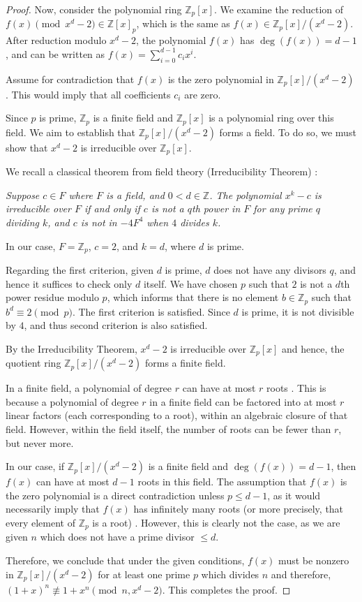 \documentclass{article}
\theoremstyle{plain}
\theoremstyle{definition}
\begin{document}
\begin{proof}
Now, consider the polynomial ring $\mathbb{Z}_p[x]$. We examine the reduction of $f(x) \pmod{x^d - 2} \in \mathbb{Z}[x]_p$, which is the same as $f(x) \in \mathbb{Z}_p[x]/(x^d - 2)$. After reduction modulo $x^d - 2$, the polynomial $f(x)$ has $\deg(f(x)) = d-1$, and can be written as $f(x) = \sum_{i=0}^{d-1} c_i x^i$.

Assume for contradiction that $f(x)$ is the zero polynomial in $\mathbb{Z}_p[x]/(x^d - 2)$. This would imply that all coefficients $c_i$ are zero.

Since $p$ is prime, $\mathbb{Z}_p$ is a finite field and $\mathbb{Z}_p[x]$ is a polynomial ring over this field. We aim to establish that $\mathbb{Z}_p[x]/(x^d - 2)$ forms a field. To do so, we must show that $x^d - 2$ is irreducible over $\mathbb{Z}_p[x]$.

We recall a classical theorem from field theory (Irreducibility Theorem) \cite{karpilovsky1989fields}:

\textit{Suppose $c \in F$ where $F$ is a field, and $0 < d \in \mathbb{Z}$. The polynomial $x^k - c$ is irreducible over $F$ if and only if $c$ is not a $q$th power in $F$ for any prime $q$ dividing $k$, and $c$ is not in $-4F^4$ when $4$ divides $k$.}

In our case, $F = \mathbb{Z}_p$, $c = 2$, and $k = d$, where $d$ is prime.

Regarding the first criterion, given $d$ is prime, $d$ does not have any divisors $q$, and hence it suffices to check only $d$ itself. We have chosen $p$ such that $2$ is not a $d$th power residue modulo $p$, which informs that there is no element $b \in \mathbb{Z}_p$ such that $b^d \equiv 2 \pmod{p}$. The first criterion is satisfied. Since $d$ is prime, it is not divisible by $4$, and thus second criterion is also satisfied.

By the Irreducibility Theorem, $x^d - 2$ is irreducible over $\mathbb{Z}_p[x]$ and hence, the quotient ring $\mathbb{Z}_p[x]/(x^d - 2)$ forms a finite field.

In a finite field, a polynomial of degree $r$ can have at most $r$ roots \cite{dummit2004abstractalgebra}. This is because a polynomial of degree $r$ in a finite field can be factored into at most $r$ linear factors (each corresponding to a root), within an algebraic closure of that field. However, within the field itself, the number of roots can be fewer than $r$, but never more.

In our case, if $\mathbb{Z}_p[x]/(x^d - 2)$ is a finite field and $\deg(f(x)) = d-1$, then $f(x)$ can have at most $d-1$ roots in this field. The assumption that $f(x)$ is the zero polynomial is a direct contradiction unless $p \leq d-1$, as it would necessarily imply that $f(x)$ has infinitely many roots (or more precisely, that every element of $\mathbb{Z}_p$ is a root) \cite{koppartywang2014roots}. However, this is clearly not the case, as we are given $n$ which does not have a prime divisor $\leq d$.

Therefore, we conclude that under the given conditions, $f(x)$ must be nonzero in $\mathbb{Z}_p[x]/(x^d - 2)$ for at least one prime $p$ which divides $n$ and therefore, $(1 + x)^n \not\equiv 1 + x^n \pmod{n, x^d-2}$. This completes the proof.
\end{proof}
\end{document}
